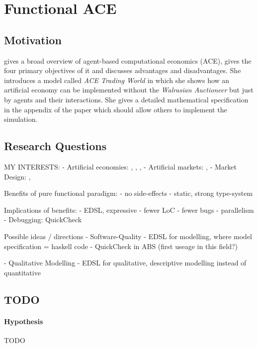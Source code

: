 \section{Functional ACE}

\subsection{Motivation}
\cite{tesfatsion_agent-based_2006} gives a broad overview of agent-based computational economics (ACE), gives the four primary objectives of it and discusses advantages and disadvantages. She introduces a model called \textit{ACE Trading World} in which she shows how an artificial economy can be implemented without the \textit{Walrasian Auctioneer} but just by agents and their interactions. She gives a detailed mathematical specification in the appendix of the paper which should allow others to implement the simulation.

\subsection{Research Questions}

MY INTERESTS:
- Artificial economies: \cite{tesfatsion_agent-based_2006}, \cite{gintis_emergence_2006}, \cite{gintis_dynamics_2007}, \cite{gaffeo_adaptive_2008}
- Artificial markets: \cite{mackie-mason_chapter_2006}, \cite{darley_nasdaq_2007}
- Market Design: \cite{marks_chapter_2006}, \cite{budish_editors_2015}

Benefits of pure functional paradigm:
- no side-effects
- static, strong type-system

Implications of benefits:
- EDSL, expressive
- fewer LoC
- fewer bugs
- parallelism
- Debugging: QuickCheck

Possible ideas / directions
- Software-Quality
	- EDSL for modelling, where model specification = haskell code
	- QuickCheck in ABS (first useage in this field?)

- Qualitative Modelling
	- EDSL for qualitative, descriptive modelling instead of quantitative

\subsection{TODO}
\paragraph{Hypothesis} TODO
